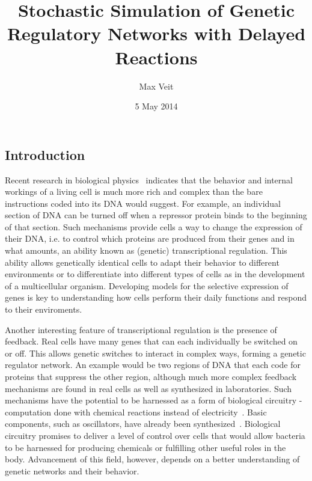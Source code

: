 \documentclass[english,letterpaper,12pt]{article}
\begin{document}
\title{Stochastic Simulation of Genetic Regulatory Networks with Delayed Reactions}
\author{Max Veit}
\date{5 May 2014}

\maketitle

\tableofcontents

\begin{doublespacing}

\section{Introduction} %
\label{sec:introduction}

Recent research in biological physics~\cite{ecoli-decision} indicates that the behavior and internal workings of a living cell is much more rich and complex than the bare instructions coded into its DNA would suggest. For example, an individual section of DNA can be turned off when a repressor protein binds to the beginning of that section. Such mechanisms provide cells a way to change the expression of their DNA, i.e. to control which proteins are produced from their genes and in what amounts, an ability known as (genetic) transcriptional regulation. This ability allows genetically identical cells to adapt their behavior to different environments or to differentiate into different types of cells as in the development of a multicellular organism. Developing models for the selective expression of genes is key to understanding how cells perform their daily functions and respond to their enviroments.

Another interesting feature of transcriptional regulation is the presence of feedback. Real cells have many  genes that can each individually be switched on or off. This allows genetic switches to interact in complex ways, forming a genetic regulator network. An example would be two regions of DNA that each code for proteins that suppress the other region, although much more complex feedback mechanisms are found in real cells as well as synthesized in laboratories.  Such mechanisms have the potential to be harnessed as a form of biological circuitry - computation done with chemical reactions instead of electricity~\cite{bio-circuits}. Basic components, such as oscillators, have already been synthesized~\cite{synth-osc}. Biological circuitry promises to deliver a level of control over cells that would allow bacteria to be harnessed for producing chemicals or fulfilling other useful roles in the body. Advancement of this field, however, depends on a better understanding of genetic networks and their behavior.


\end{doublespacing}
\end{document}

